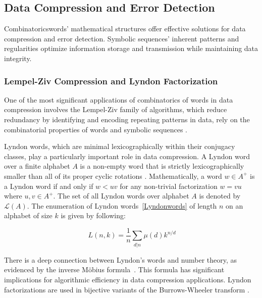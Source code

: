 \documentclass[12pt,a4paper]{article}
\begin{document}
\subsection{Data Compression and Error Detection}

Combinatoricswords' mathematical structures offer effective solutions for data compression and error detection. Symbolic sequences' inherent patterns and regularities optimize information storage and transmission while maintaining data integrity.
\subsubsection{Lempel-Ziv Compression and Lyndon Factorization}

One of the most significant applications of combinatorics of words in data compression involves the Lempel-Ziv family of algorithms, which reduce redundancy by identifying and encoding repeating patterns in data, rely on the combinatorial properties of words and symbolic sequences \cite{Glen2012}.

Lyndon words, which are minimal lexicographically within their conjugacy classes, play a particularly important role in data compression. A Lyndon word over a finite alphabet $A$ is a non-empty word that is strictly lexicographically smaller than all of its proper cyclic rotations \cite{Lothaire}. Mathematically, a word $w \in A^+$ is a Lyndon word if and only if $w < uv$ for any non-trivial factorization $w = vu$ where $u, v \in A^+$. The set of all Lyndon words over alphabet $A$ is denoted by $\mathcal{L}(A)$. The enumeration of Lyndon words~\eqref{Lyndonwords} of length $n$ on an alphabet of size $k$ is given by following:

\begin{equation}~\label{Lyndonwords}
L(n,k) = \frac{1}{n}\sum_{d|n}\mu(d)k^{n/d}
\end{equation}

There is a deep connection between Lyndon's words and number theory, as evidenced by the inverse M\"{o}bius formula~\cite{Ruskey}. This formula has significant implications for algorithmic efficiency in data compression applications. Lyndon factorizations are used in bijective variants of the Burrows-Wheeler transform \cite{Glen2012}.
\end{document}
